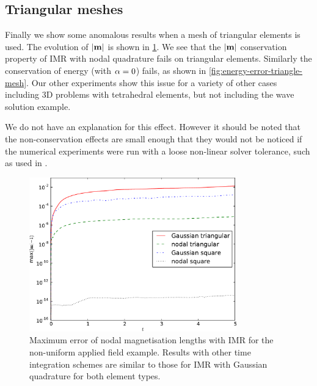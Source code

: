 \subsection{Triangular meshes}

Finally we show some anomalous results when a mesh of triangular elements is used.
The evolution of $\left|{\boldsymbol{\mathrm{m}}} \right|$ is shown in \cref{fig:ml-error-triangle-mesh}.
We see that the $\left|{\boldsymbol{\mathrm{m}}} \right|$ conservation property of IMR with nodal quadrature fails on triangular elements.
Similarly the conservation of energy (with $\alpha = 0$) fails, as shown in \cref{fig:energy-error-triangle-mesh}.
Our other experiments show this issue for a variety of other cases including 3D problems with tetrahedral elements, but not including the wave solution example.

We do not have an explanation for this effect.
However it should be noted that the non-conservation effects are small enough that they would not be noticed if the numerical experiments were run with a loose non-linear solver tolerance, such as used in \eg \cite{Bartels2006}.

\begin{figure}
  \centering
  \includegraphics[width=0.8\textwidth]
  {plots/nonuniform-h-triangles-ml/mlengtherrormaxesvstimes.pdf}
  \caption{Maximum error of nodal magnetisation lengths with IMR for the non-uniform applied field example.
Results with other time integration schemes are similar to those for IMR with Gaussian quadrature for both element types.}
  \label{fig:ml-error-triangle-mesh}
\end{figure}

